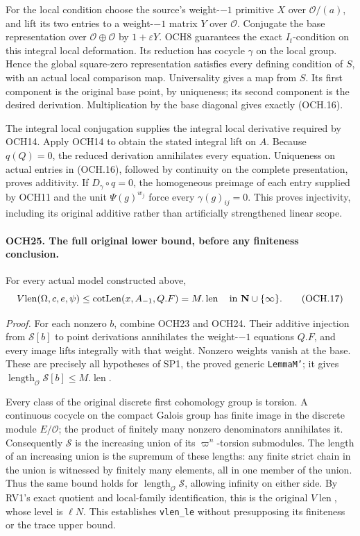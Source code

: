 For the local condition choose the source's weight-\(-1\)
primitive \(X\) over \(\mathcal O/(a)\), and lift its two
entries to a weight-\(-1\) matrix \(Y\) over
\(\mathcal O\).  Conjugate the base representation over
\(\mathcal O\oplus\mathcal O\) by \(1+\varepsilon Y\).
OCH8 guarantees the exact \(I_t\)-condition on this integral
local deformation.  Its reduction has cocycle \(\gamma\)
on the local group.  Hence the global square-zero representation
satisfies every defining condition of \(S\), with an actual
local comparison map.  Universality gives a map from \(S\).
Its first component is the original base point, by uniqueness;
its second component is the desired derivation.  Multiplication
by the base diagonal gives exactly (OCH.16).

The integral local conjugation supplies the integral local derivative
required by OCH14.  Apply OCH14 to obtain the stated integral
lift on \(A\).  Because \(q(Q)=0\), the reduced derivation
annihilates every equation.  Uniqueness on actual entries in
(OCH.16), followed by continuity on the complete presentation,
proves additivity.  If \(D_\gamma\circ q=0\), the homogeneous
preimage of each entry supplied by OCH11 and the unit
\(\Psi(g)^{w_j}\) force every \(\gamma(g)_{ij}=0\).
This proves injectivity, including its original additive rather
than artificially strengthened linear scope.

\paragraph{OCH25. The full original lower bound, before any finiteness conclusion.}
\label{claim:OCH25}
For every actual model constructed above,
\[
             V\!\operatorname{len}(\Omega,c,e,\psi)
          \le \operatorname{cotLen}(x,A_{-1},Q.F)=M.\operatorname{len}
                   \quad\hbox{in }\mathbf N\cup\{\infty\}.
 \tag{OCH.17}
\]

\emph{Proof.}
For each nonzero \(b\), combine OCH23 and OCH24.  Their
additive injection from \(\mathcal S[b]\) to point derivations
annihilates the weight-\(-1\) equations \(Q.F\), and every
image lifts integrally with that weight.  Nonzero weights vanish
at the base.  These are precisely all hypotheses of SP1, the
proved generic \texttt{LemmaM'}; it gives
\(\operatorname{length}_{\mathcal O}\mathcal S[b]\le M.\operatorname{len}\).

Every class of the original discrete first cohomology group is
torsion.  A continuous cocycle on the compact Galois group has
finite image in the discrete module \(E/\mathcal O\); the
product of finitely many nonzero denominators annihilates it.
Consequently \(\mathcal S\) is the increasing union of its
\(\varpi^n\)-torsion submodules.  The length of an increasing
union is the supremum of these lengths: any finite strict chain
in the union is witnessed by finitely many elements, all in one
member of the union.  Thus the same bound holds for
\(\operatorname{length}_{\mathcal O}\mathcal S\), allowing
infinity on either side.  By RV1's exact quotient and local-family
identification, this is the original
\(V\!\operatorname{len}\), whose level is \(\ell N\).
This establishes \texttt{vlen\_le} without presupposing its
finiteness or the trace upper bound.

